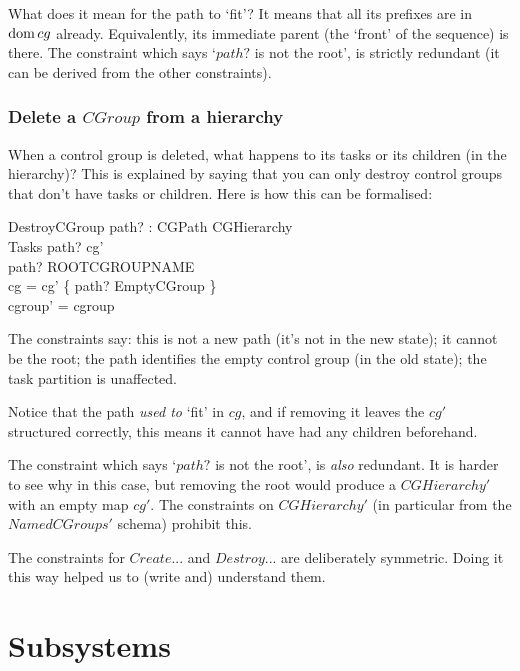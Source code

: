 \documentclass[a4paper,twoside,12pt]{article}
\begin{document}
What does it mean for the path to `fit'? It means that all its prefixes are in $\mathop{\mathrm{dom}} cg$ already. Equivalently, its immediate parent (the `front' of the sequence) is there.
The constraint which says `$path?$ is not the root', is strictly redundant (it can be derived from the other constraints).

\subsubsection{Delete a $CGroup$ from a hierarchy}

When a control group is deleted, what happens to its tasks or its children (in the hierarchy)?
This is explained by saying that you can only destroy control groups that don't have tasks or children.
Here is how this can be formalised:

\begin{schema}{DestroyCGroup}
path? : CGPath
\also
\Delta CGHierarchy \\
\Xi Tasks
\where
path? \notin \dom cg' \\
path? \neq ROOTCGROUPNAME \\
cg = cg' \cup \{ path? \mapsto EmptyCGroup \} \\
cgroup' = cgroup
\end{schema}
The constraints say: this is not a new path (it's not in the new state); it cannot be the root;
the path identifies the empty control group (in the old state); the task partition is unaffected.

Notice that the path \emph{used to} `fit' in $cg$, and if removing it leaves the $cg'$ structured correctly,
this means it cannot have had any children beforehand.

The constraint which says `$path?$ is not the root', is \emph{also} redundant.
It is harder to see why in this case, but removing the root would produce a $CGHierarchy'$ with an empty map $cg'$.
The constraints on $CGHierarchy'$ (in particular from the $NamedCGroups'$ schema) prohibit this.

The constraints for $Create$... and $Destroy$... are deliberately symmetric.
Doing it this way helped us to (write and) understand them.

\section{Subsystems}
\end{document}
